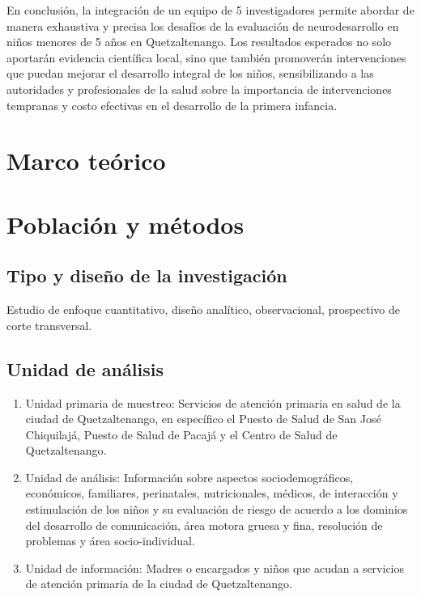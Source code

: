 \documentclass[11pt,letterpaper]{report}
\begin{document}
En conclusión, la integración de un equipo de 5 investigadores permite abordar
de manera exhaustiva y precisa los desafíos de la evaluación de neurodesarrollo
en niños menores de 5 años en Quetzaltenango. Los resultados esperados no solo
aportarán evidencia científica local, sino que también promoverán
intervenciones que puedan mejorar el desarrollo integral de los niños,
sensibilizando a las autoridades y profesionales de la salud sobre la
importancia de intervenciones tempranas y costo efectivas en el desarrollo de
la primera infancia.

	\chapter{Marco teórico}
	\chapter{Población y métodos}
\section{Tipo y diseño de la investigación}
Estudio de enfoque cuantitativo, diseño analítico, observacional, prospectivo
de corte transversal.

\section{Unidad de análisis}
	\begin{enumerate}
		\item Unidad primaria de muestreo: Servicios de atención primaria en
		salud de la ciudad de Quetzaltenango, en específico el Puesto de
		Salud de San José Chiquilajá, Puesto de Salud de Pacajá y el Centro de
		Salud de Quetzaltenango.
		\item Unidad de análisis: Información sobre aspectos sociodemográficos,
		económicos, familiares, perinatales, nutricionales, médicos, de
		interacción y estimulación de los niños y su evaluación de riesgo de
		acuerdo a los dominios del desarrollo de comunicación, área motora
		gruesa y fina, resolución de problemas y área socio-individual.
		\item Unidad de información: Madres o encargados y niños que acudan a
		servicios de atención primaria de la ciudad de Quetzaltenango.
	\end{enumerate}
\end{document}
